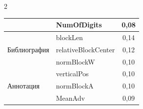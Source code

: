 \begin{multicols}{2}
{\begin{center}
\begin{tabular}{|l|l|c|}


        & {NumOfDigits} & 0,08\\




                \hline


&  {blockLen} & 0,14\\




        Библиография  & {relativeBlockCenter} & 


0,12 \\




        & {normBlockW} & 0,10\\




                \hline


 & {verticalPos} & 0,10\\




               Аннотация & normBlockA & 0,10\\




        & MeanAdv & 0,09\\




        \hline  


     \end{tabular}


               \vspace*{1pt}   


   \end{center}


   }







\setcounter{table}{5}





\end{multicols}





